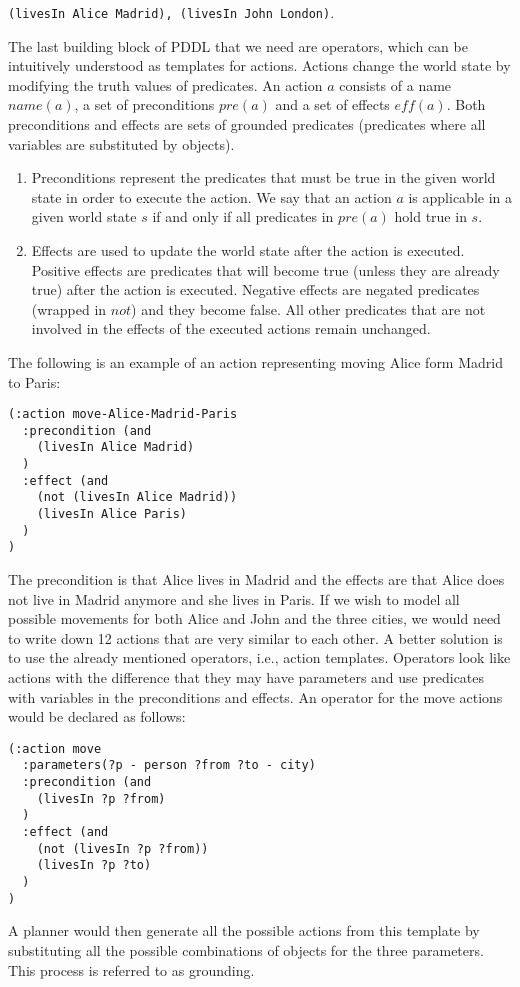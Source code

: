 \documentclass[runningheads]{llncs}
\begin{document}
\verb _(livesIn Alice Madrid), (livesIn John London)_.

The last building block of PDDL that we need are operators, which can be intuitively understood as templates
for actions. Actions change the world state by modifying the truth values of predicates. An action $a$ consists
of a name $name(a)$, a set of preconditions $pre(a)$ and a set of effects $eff(a)$.
Both preconditions and effects are sets of grounded
predicates (predicates where all variables are substituted by objects).
\begin{enumerate}
\item Preconditions represent the predicates
that must be true in the given world state in order to execute the action. We say that an action $a$
is applicable in a given world state $s$ if and only if all predicates in $pre(a)$ hold true in $s$.
\item Effects are used to update the world state after the action is executed. Positive effects are
predicates that will become true (unless they are already true) after the action is executed. Negative
effects are negated predicates (wrapped in $not$) and they become false. All other predicates that are not
involved in the effects of the executed actions remain unchanged.
\end{enumerate}
The following is an example of an action representing moving Alice form Madrid to Paris:
\begin{verbatim}
(:action move-Alice-Madrid-Paris
  :precondition (and
    (livesIn Alice Madrid)
  )
  :effect (and
    (not (livesIn Alice Madrid))
    (livesIn Alice Paris)
  )
)
\end{verbatim}
The precondition is that Alice lives in Madrid and the effects are that Alice does not live in Madrid anymore and
she lives in Paris. If we wish to model all possible movements for both Alice and John and the three cities, we
would need to write down 12 actions that are very similar to each other. A better solution is to use the
already mentioned operators, i.e., action templates. Operators look like actions with the difference that they
may have parameters and use predicates with variables in the preconditions and effects. An operator for
the move actions would be declared as follows:
\begin{verbatim}
(:action move
  :parameters(?p - person ?from ?to - city)
  :precondition (and
    (livesIn ?p ?from)
  )
  :effect (and
    (not (livesIn ?p ?from))
    (livesIn ?p ?to)
  )
)
\end{verbatim}
A planner would then generate all the possible actions from this template by substituting all the possible
combinations of objects for the three parameters. This process is referred to as grounding.
\end{document}
